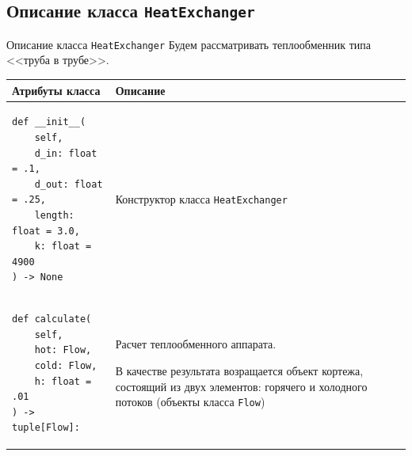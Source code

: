 \documentclass[aspectratio=169, mathserif]{beamer}%
\begin{document}
\subsection{Описание класса \texttt{HeatExchanger}}
\begin{frame}[fragile]{Описание класса \texttt{HeatExchanger}}
\scriptsize
Будем рассматривать теплообменник типа <<труба в трубе>>.
\vfill
\begin{table}[h!]
	\centering
	\renewcommand{\arraystretch}{1.2}
	\begin{tabular}{|p{.49\linewidth}|p{.49\linewidth}|}
		\hline
		\textbf{Атрибуты класса} & \textbf{Описание}  \\
		\hline
\begin{minipage}{\linewidth}
\vfill
\begin{verbatim}
def __init__(
    self,
    d_in: float = .1,
    d_out: float = .25,
    length: float = 3.0,
    k: float = 4900
) -> None
\end{verbatim}
\vfill
\end{minipage}
		& Конструктор класса \texttt{HeatExchanger}\\
		\hline
\begin{minipage}{\linewidth}
\vfill
\begin{verbatim}
def calculate(
    self,
    hot: Flow,
    cold: Flow,
    h: float = .01
) -> tuple[Flow]:
\end{verbatim}
\vfill
\end{minipage}
		& Расчет теплообменного аппарата.

		 В качестве результата возращается объект кортежа, состоящий из двух элементов: горячего и холодного потоков (объекты класса \texttt{Flow})\\
		\hline
	\end{tabular}
\end{table}
\vfill
\end{frame}

\end{document}
